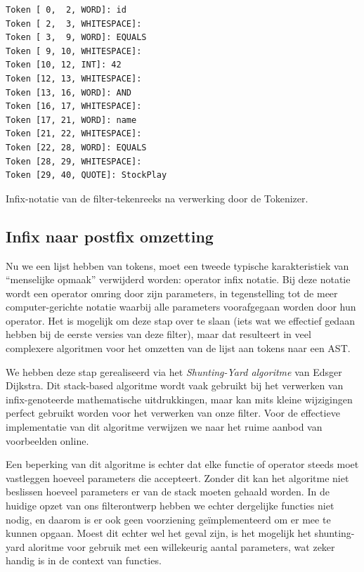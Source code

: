 \begin{code}
\begin{verbatim}
Token [ 0,  2, WORD]: id
Token [ 2,  3, WHITESPACE]:  
Token [ 3,  9, WORD]: EQUALS
Token [ 9, 10, WHITESPACE]:  
Token [10, 12, INT]: 42
Token [12, 13, WHITESPACE]:  
Token [13, 16, WORD]: AND
Token [16, 17, WHITESPACE]:  
Token [17, 21, WORD]: name
Token [21, 22, WHITESPACE]:  
Token [22, 28, WORD]: EQUALS
Token [28, 29, WHITESPACE]:  
Token [29, 40, QUOTE]: StockPlay
\end{verbatim}
\caption{Infix-notatie van de filter-tekenreeks na verwerking door de Tokenizer.}
\end{code}

\subsection{Infix naar postfix omzetting}

Nu we een lijst hebben van tokens, moet een tweede typische karakteristiek van ``menselijke opmaak'' verwijderd worden: operator infix notatie. Bij deze notatie wordt een operator omring door zijn parameters, in tegenstelling tot de meer computer-gerichte notatie waarbij alle parameters voorafgegaan worden door hun operator. Het is mogelijk om deze stap over te slaan (iets wat we effectief gedaan hebben bij de eerste versies van deze filter), maar dat resulteert in veel complexere algoritmen voor het omzetten van de lijst aan tokens naar een AST.

We hebben deze stap gerealiseerd via het \emph{Shunting-Yard algoritme} van Edsger Dijkstra. Dit stack-based algoritme wordt vaak gebruikt bij het verwerken van infix-genoteerde mathematische uitdrukkingen, maar kan mits kleine wijzigingen perfect gebruikt worden voor het verwerken van onze filter. Voor de effectieve implementatie van dit algoritme verwijzen we naar het ruime aanbod van voorbeelden online.

Een beperking van dit algoritme is echter dat elke functie of operator steeds moet vastleggen hoeveel parameters die accepteert. Zonder dit kan het algoritme niet beslissen hoeveel parameters er van de stack moeten gehaald worden. In de huidige opzet van ons filterontwerp hebben we echter dergelijke functies niet nodig, en daarom is er ook geen voorziening ge\"implementeerd om er mee te kunnen opgaan. Moest dit echter wel het geval zijn, is het mogelijk het shunting-yard aloritme  voor gebruik met een willekeurig aantal parameters, wat zeker handig is in de context van functies.

